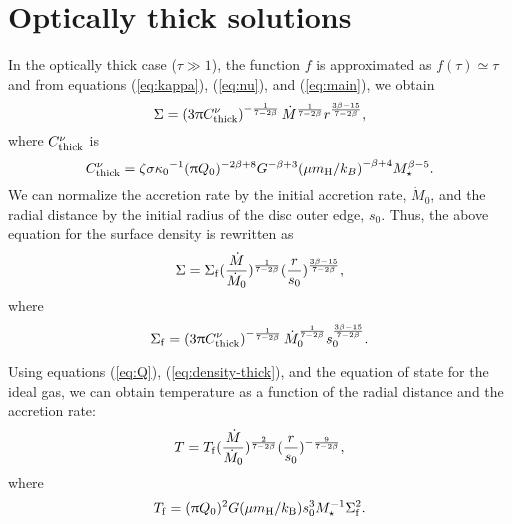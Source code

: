 \documentclass[apj]{emulateapj}
\begin{document}
\section{Optically thick solutions}
%
In the optically thick case ($\tau\gg 1$), the function $f$ is approximated as $f(\tau) \simeq \tau $ and from equations (\ref{eq:kappa}), (\ref{eq:nu}), and (\ref{eq:main}), we obtain
%
\begin{equation}
\Sigma = \left(3\uppi C_{\rm thick}^{\nu} \right)^{-\frac{1}{7-2\beta}} \dot{M}^{\frac{1}{7-2\beta}} r^{\frac{3\beta -15}{7-2\beta}},
\end{equation}
%
where $C_{\rm thick}^{\nu}$ is 
%
\begin{equation}
C_{\rm thick}^{\nu}= \zeta  \sigma {\kappa_0}^{-1}  {(\uppi Q_0)^{-2\beta+8}} G^{-\beta+3} {(\mu m_{\rm H}/k_B)}^{-\beta+4} M_{\star}^{\beta-5}.
\end{equation}
%
%
We can normalize the accretion rate by the initial accretion rate, $\dot{M}_{0}$, and the radial distance by the initial radius of the disc outer edge, $s_0$. Thus, the above equation for the surface density is rewritten as
%
\begin{equation}\label{eq:density-thick}
\Sigma = \Sigma_{\rm f}  (\frac{\dot{M}}{\dot{M}_0}  )^{\frac{1}{7-2\beta}} (\frac{r}{s_0} )^{\frac{3\beta -15}{7-2\beta}},
\end{equation}
%
where
%
\begin{equation}
\Sigma_{\rm f}=\left(3\uppi C_{\rm thick}^{\nu} \right)^{-\frac{1}{7-2\beta}} \dot{M}_{0}^{\frac{1}{7-2\beta}} s_{0}^{\frac{3\beta -15}{7-2\beta}}.
\end{equation}
%

Using equations (\ref{eq:Q}), (\ref{eq:density-thick}), and the equation of state for the ideal gas, we can obtain temperature  as a function of the radial distance and the accretion rate:
%
\begin{equation}
T=T_{\rm f} (\frac{\dot{M}}{\dot{M}_0})^{\frac{2}{7-2\beta}} (\frac{r}{s_0})^{-\frac{9}{7-2\beta}},
\end{equation}
%
where
%
\begin{equation}
T_{\rm f} = (\uppi Q_0 )^2 G (\mu m_{\rm H} /k_{\rm B})  s_{0}^{3} M_{\star}^{-1} \Sigma_{\rm f}^{2}.
\end{equation}
%
\end{document}
